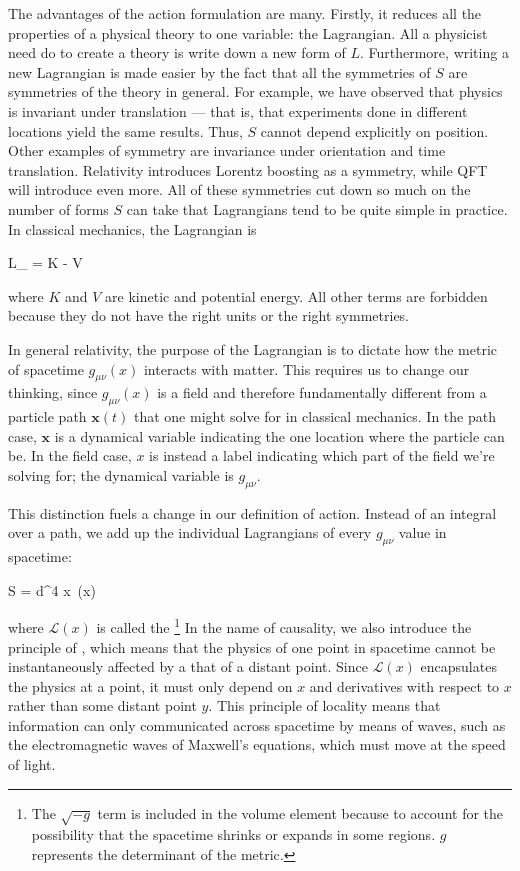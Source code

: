 The advantages of the action formulation are many. Firstly, it reduces all the properties of a physical theory to one variable: the Lagrangian. All a physicist need do to create a theory is write down a new form of $L$. Furthermore, writing a new Lagrangian is made easier by the fact that all the symmetries of $S$ are symmetries of the theory in general. For example, we have observed that physics is invariant under translation --- that is, that experiments done in different locations yield the same results. Thus, $S$ cannot depend explicitly on position. Other examples of symmetry are invariance under orientation and time translation. Relativity introduces Lorentz boosting as a symmetry, while QFT will introduce even more. All of these symmetries cut down so much on the number of forms $S$ can take that Lagrangians tend to be quite simple in practice. In classical mechanics, the Lagrangian is
\begin{e}
  L_ = K - V
  \label{eqn:classical-lagrangian}
\end{e}
where $K$ and $V$ are kinetic and potential energy. All other terms are forbidden because they do not have the right units or the right symmetries.

In general relativity, the purpose of the Lagrangian is to dictate how the metric of spacetime $g_{\mu \nu}(x)$ interacts with matter. This requires us to change our thinking, since $g_{\mu \nu}(x)$ is a field and therefore fundamentally different from a particle path $\bm x(t)$ that one might solve for in classical mechanics. In the path case, $\bm x$ is a dynamical variable indicating the one location where the particle can be. In the field case, $x$ is instead a label indicating which part of the field we're solving for; the dynamical variable is $g_{\mu \nu}$.

This distinction fuels a change in our definition of action. Instead of an integral over a path, we add up the individual Lagrangians of every $g_{\mu \nu}$ value in spacetime:
\begin{e}
  S = \int d^4 x\, (x)
\end{e}
where $\mathcal{L}(x)$ is called the \footnote{The $\sqrt{-g}$ term is included in the volume element because to account for the possibility that the spacetime shrinks or expands in some regions. $g$ represents the determinant of the metric.} In the name of causality, we also introduce the principle of , which means that the physics of one point in spacetime cannot be instantaneously affected by a that of a distant point. Since $\mathcal{L}(x)$ encapsulates the physics at a point, it must only depend on $x$ and derivatives with respect to $x$ rather than some distant point $y$. This principle of locality means that information can only communicated across spacetime by means of waves, such as the electromagnetic waves of Maxwell's equations, which must move at the speed of light.


